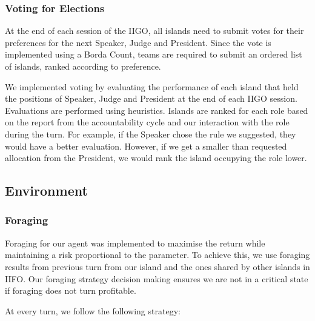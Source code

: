 \documentclass{article}
\begin{document}
\subsubsection{Voting for Elections}
At the end of each session of the IIGO, all islands need to submit votes for their preferences for the next Speaker, Judge and President. Since the vote is implemented using a Borda Count, teams are required to submit an ordered list of islands, ranked according to preference. 

We implemented voting by evaluating the performance of each island that held the positions of Speaker, Judge and President at the end of each IIGO session. Evaluations are performed using heuristics. Islands are ranked for each role based on the report from the accountability cycle and our interaction with the role during the turn. For example, if the Speaker chose the rule we suggested, they would have a better evaluation. However, if we get a smaller than requested allocation from the President, we would rank the island occupying the role lower.

\subsection{Environment}

\subsubsection{Foraging}
Foraging for our agent was implemented to maximise the return while maintaining a risk proportional to the  parameter. To achieve this, we use foraging results from previous turn from our island and the ones shared by other islands in  IIFO.
Our foraging strategy decision making ensures we are not in a critical state if foraging does not turn profitable.

At every turn, we follow the following strategy:
\end{document}
